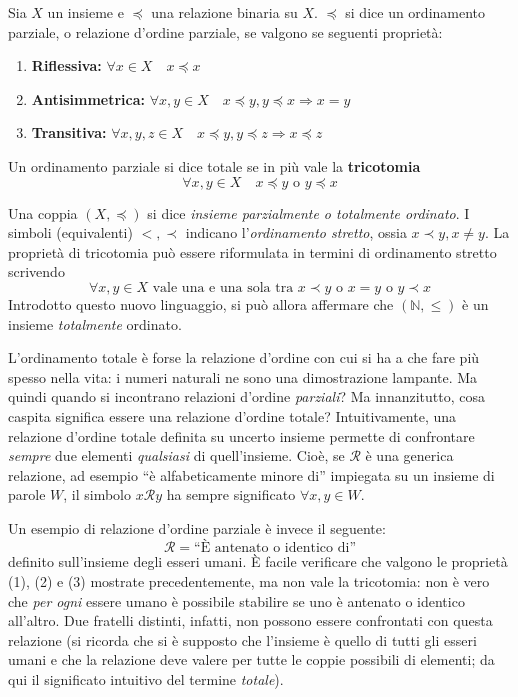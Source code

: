 \documentclass[oneside]{book}
\begin{document}
\begin{tcolorbox}[colback=yellow!30, colframe=yellow!30!black, title={Relazione d'ordine parziale e totale}]
Sia $X$ un insieme e $\preceq$ una relazione binaria su
$X$. $\preceq$ si dice un ordinamento parziale, o relazione
d'ordine parziale, se valgono se seguenti proprietà:
\begin{enumerate}
    \item \textbf{Riflessiva:} $\forall x\in X \quad x\preceq x$
    \item \textbf{Antisimmetrica:} $\forall x,y\in X \quad x\preceq y, y\preceq x \Longrightarrow x = y$
    \item \textbf{Transitiva:} $\forall x,y,z\in X \quad x\preceq y, y\preceq z \Longrightarrow x\preceq z$
\end{enumerate}
Un ordinamento parziale si dice totale se in più vale la \textbf{tricotomia}
\[ \forall x,y\in X \quad x\preceq y \text{ o } y\preceq x \]
\end{tcolorbox}
Una coppia $(X,\preceq)$ si dice \textit{insieme parzialmente o totalmente
ordinato}.
I simboli (equivalenti) $<,\prec$ indicano l'\textit{ordinamento stretto}, ossia
$x\prec y, x\not=y$. La proprietà di tricotomia può essere riformulata
in termini di ordinamento stretto scrivendo
\[ \forall x,y\in X \text{ vale una e una sola tra } x\prec y \text{ o } x=y \text{ o } y\prec x \]
Introdotto questo nuovo linguaggio, si può allora affermare che
$(\mathbb{N},\leq)$ è un insieme \textit{totalmente} ordinato.

L'ordinamento totale è forse la relazione d'ordine con cui si ha a che
fare più spesso nella vita: i numeri naturali ne sono una dimostrazione
lampante. Ma quindi quando si incontrano relazioni d'ordine \textit{parziali}?
Ma innanzitutto, cosa caspita significa essere una relazione d'ordine totale? Intuitivamente,
una relazione d'ordine totale definita su uncerto insieme permette di
confrontare \textit{sempre} due elementi \textit{qualsiasi} di
quell'insieme. Cioè, se $\mathcal{R}$ è una generica relazione, ad esempio
``è alfabeticamente minore di'' impiegata su un insieme di parole $W$,
il simbolo $x\mathcal{R}y$ ha sempre significato $\forall x,y\in W$.

Un esempio di relazione d'ordine parziale è invece il seguente:
\[ \mathcal{R} = \text{``È antenato o identico di''} \]
definito sull'insieme degli esseri umani. È facile verificare che
valgono le proprietà (1), (2) e (3) mostrate precedentemente, ma
non vale la tricotomia: non è vero che \textit{per ogni} essere
umano è possibile stabilire se uno è antenato o identico all'altro.
Due fratelli distinti, infatti, non possono essere confrontati con questa
relazione (si ricorda che si è supposto che l'insieme è quello di tutti
gli esseri umani e che la relazione deve valere per tutte le coppie
possibili di elementi; da qui il significato intuitivo del termine
\textit{totale}).
\end{document}
